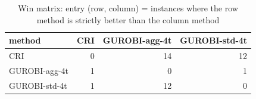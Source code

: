 \begin{table}[htbp]
\centering
\small
\caption{Win matrix: entry (row, column) = instances where the row method is strictly better than the column method}
\label{tab:E7_gurobi_threads_b60_wins}
\begin{tabular}{lrrr}
\toprule
method & CRI & GUROBI-agg-4t & GUROBI-std-4t \\
\midrule
CRI & 0 & 14 & 12 \\
GUROBI-agg-4t & 1 & 0 & 1 \\
GUROBI-std-4t & 1 & 12 & 0 \\
\bottomrule
\end{tabular}
\end{table}

